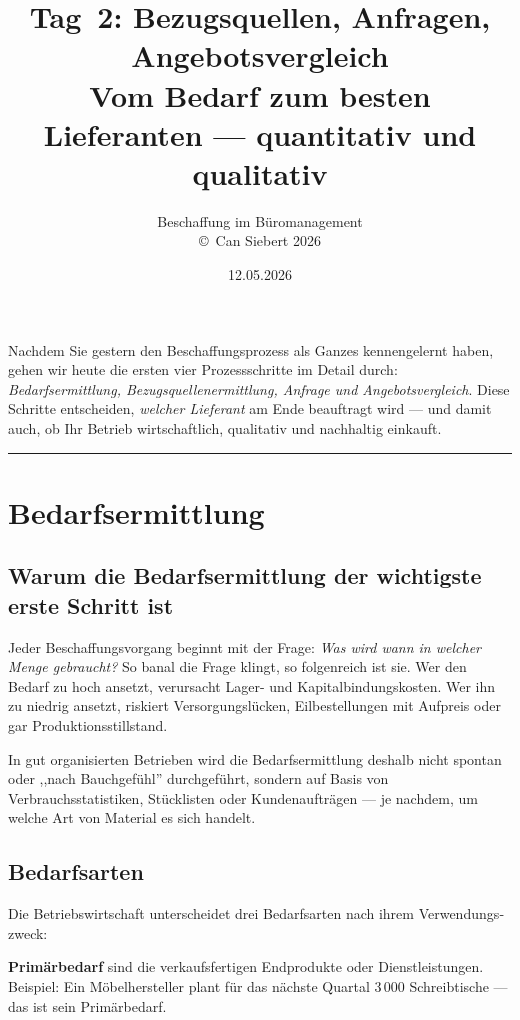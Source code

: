 \documentclass[11pt, a4paper]{article}
\title{\vspace*{-1.5cm}\Huge\bfseries\color{bfwPrimaryDark}Tag~2: Bezugsquellen, Anfragen, Angebotsvergleich\\[0.4em]
  \large\color{bfwInkSoft}\textnormal{Vom Bedarf zum besten Lieferanten --- quantitativ und qualitativ}}
\author{\textsf{Beschaffung im Büromanagement}\\
\textsf{\small\copyright\ Can Siebert\,\textperiodcentered\,2026}}
\date{12.05.2026}
\begin{document}
\maketitle
\thispagestyle{empty}

\vspace{1em}
\begin{merksatz}[title={\bfseries Worum geht es heute?}]
Nachdem Sie gestern den Beschaffungsprozess als Ganzes kennengelernt haben, gehen wir
heute die ersten vier Prozessschritte im Detail durch: \emph{Bedarfsermittlung,
Bezugsquellen­ermittlung, Anfrage und Angebotsvergleich}. Diese Schritte entscheiden,
\emph{welcher Lieferant} am Ende beauftragt wird --- und damit auch, ob Ihr Betrieb
wirtschaftlich, qualitativ und nachhaltig einkauft.
\end{merksatz}

\tableofcontents
\vspace{1em}
\hrule
\vspace{1em}

\section{Bedarfsermittlung}

\subsection{Warum die Bedarfsermittlung der wichtigste erste Schritt ist}

Jeder Beschaffungsvorgang beginnt mit der Frage: \emph{Was wird wann in welcher Menge
gebraucht?} So banal die Frage klingt, so folgenreich ist sie. Wer den Bedarf zu hoch
ansetzt, verursacht Lager- und Kapital­bindungs­kosten. Wer ihn zu niedrig ansetzt,
riskiert Versorgungs­lücken, Eil­bestellungen mit Aufpreis oder gar Produktions­stillstand.

In gut organisierten Betrieben wird die Bedarfsermittlung deshalb nicht spontan oder
,,nach Bauchgefühl'' durchgeführt, sondern auf Basis von Verbrauchsstatistiken, Stücklisten
oder Kundenaufträgen --- je nachdem, um welche Art von Material es sich handelt.

\subsection{Bedarfsarten}

Die Betriebswirtschaft unterscheidet drei Bedarfsarten nach ihrem Verwendungs­zweck:

\textbf{Primärbedarf} sind die verkaufsfertigen Endprodukte oder Dienstleistungen.
Beispiel: Ein Möbelhersteller plant für das nächste Quartal 3\,000 Schreibtische ---
das ist sein Primärbedarf.
\end{document}
